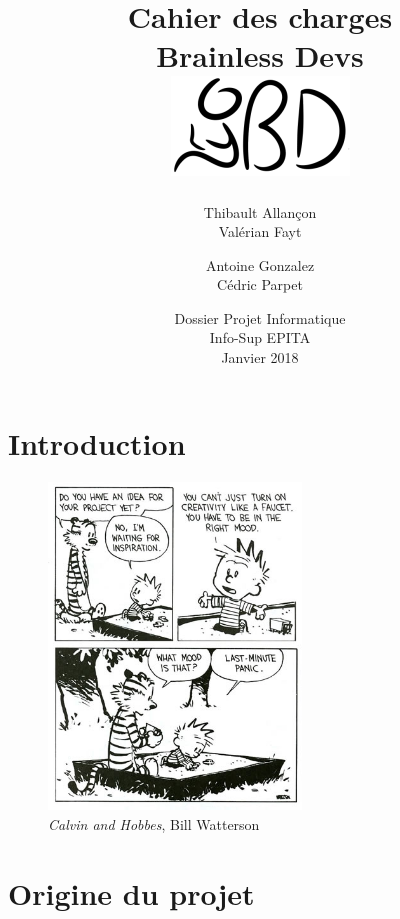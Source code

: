 \documentclass[12pt]{report}
\begin{document}
\title{
	{\Huge Cahier des charges}\\
	{\large Brainless Devs}\\
	{\vspace{2em}\includegraphics[center]{logo_short.png}}
}
\author{
	Thibault Allançon\\
	Valérian Fayt
	\and
	Antoine Gonzalez\\
	Cédric Parpet}
\date{
	\vfill 
	Dossier Projet Informatique\\
	Info-Sup EPITA\\
	Janvier 2018
}
\maketitle
\tableofcontents

\chapter{Introduction}

\begin{figure}
    \centering
    \includegraphics[width=0.6\textwidth]{project_mood}
    \caption*{\textit{Calvin and Hobbes}, Bill Watterson}
\end{figure}

\chapter{Origine du projet}
\end{document}
